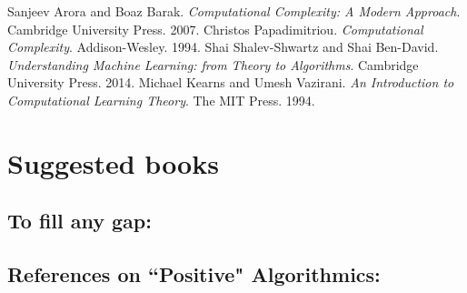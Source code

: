 \documentclass{article}
\begin{document}
\begin{comment}
			\paragraph{Solution.}
			\mbox{}
			
			\begin{enumerate}
				\item {\footnotesize 3COL} in \textbf{NP} (previous exercise session)
				\item {\footnotesize 3COL} is \textbf{NP}-Hard by showing that {\footnotesize 3SAT}
			\end{enumerate}
		\end{exercise}
\end{comment}






	\cleardoublepage
	\begin{thebibliography}{9}
			Sanjeev Arora and Boaz Barak. \emph{Computational Complexity: A Modern Approach}. Cambridge University Press. 2007.
			Christos Papadimitriou. \emph{Computational Complexity}. Addison-Wesley. 1994.
			Shai Shalev-Shwartz and Shai Ben-David. \emph{Understanding Machine Learning: from Theory to Algorithms}. Cambridge University Press. 2014.
			Michael Kearns and Umesh Vazirani. \emph{An Introduction to Computational Learning Theory}. The MIT Press. 1994.
	\end{thebibliography}


	\appendix
	\newpage
	\section{Suggested books}
		\subsection*{To fill any gap:}
			\begin{figure}[h]
   				\setlength{\fboxsep}{0pt}
   				\setlength{\fboxrule}{0.7pt}
			\end{figure}
		
		\subsection*{References on ``Positive" Algorithmics:}
			\begin{figure}[h]
   				\setlength{\fboxsep}{0pt}
   				\setlength{\fboxrule}{0.7pt}
   				\setlength{\fboxsep}{0pt}
   				\setlength{\fboxrule}{0.7pt}
			\end{figure}
\end{document}
